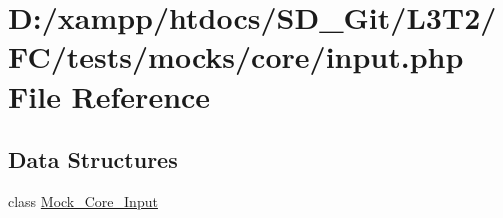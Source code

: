 \hypertarget{tests_2mocks_2core_2_input_8php}{}\section{D\+:/xampp/htdocs/\+S\+D\+\_\+\+Git/\+L3\+T2/\+F\+C/tests/mocks/core/input.php File Reference}
\label{tests_2mocks_2core_2_input_8php}
\subsection*{Data Structures}
\begin{DoxyCompactItemize}
\item 
class \hyperlink{class_mock___core___input}{Mock\+\_\+\+Core\+\_\+\+Input}
\end{DoxyCompactItemize}
